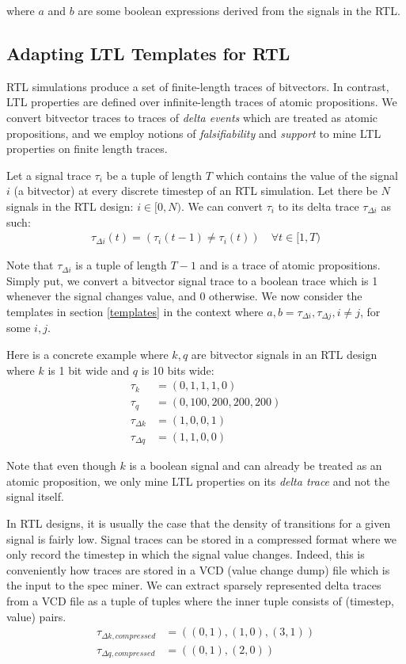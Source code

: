 \documentclass[acmlarge,11pt]{acmart}
\begin{document}
where $a$ and $b$ are some boolean expressions derived from the signals in the RTL.

\subsection{Adapting LTL Templates for RTL}
RTL simulations produce a set of finite-length traces of bitvectors.
In contrast, LTL properties are defined over infinite-length traces of atomic propositions.
We convert bitvector traces to traces of \textit{delta events} which are treated as atomic propositions, and we employ notions of \textit{falsifiability} and \textit{support} to mine LTL properties on finite length traces.

Let a signal trace $\tau_i$ be a tuple of length $T$ which contains the value of the signal $i$ (a bitvector) at every discrete timestep of an RTL simulation.
Let there be $N$ signals in the RTL design: $i \in [0,N)$.
We can convert $\tau_i$ to its delta trace $\tau_{\Delta i}$ as such:
\begin{align*}
  \tau_{\Delta i}(t) = (\tau_i(t-1) \neq \tau_i(t)) \quad \forall t \in [1,T)
\end{align*}

Note that $\tau_{\Delta i}$ is a tuple of length $T-1$ and is a trace of atomic propositions.
Simply put, we convert a bitvector signal trace to a boolean trace which is 1 whenever the signal changes value, and 0 otherwise.
We now consider the templates in section \ref{templates} in the context where $a, b = \tau_{\Delta i}, \tau_{\Delta j}, i \neq j$, for some $i, j$.

Here is a concrete example where $k, q$ are bitvector signals in an RTL design where $k$ is 1 bit wide and $q$ is 10 bits wide:
\begin{align*}
  \tau_{k} &= (0, 1, 1, 1, 0) \\
  \tau_{q} &= (0, 100, 200, 200, 200) \\
  \tau_{\Delta k} &= (1, 0, 0, 1) \\
  \tau_{\Delta q} &= (1, 1, 0, 0)
\end{align*}

Note that even though $k$ is a boolean signal and can already be treated as an atomic proposition, we only mine LTL properties on its \textit{delta trace} and not the signal itself.

In RTL designs, it is usually the case that the density of transitions for a given signal is fairly low.
Signal traces can be stored in a compressed format where we only record the timestep in which the signal value changes.
Indeed, this is conveniently how traces are stored in a VCD (value change dump) file which is the input to the spec miner.
We can extract sparsely represented delta traces from a VCD file as a tuple of tuples where the inner tuple consists of (timestep, value) pairs.
\begin{align*}
  \tau_{\Delta k, compressed} &= ((0,1), (1,0), (3,1)) \\
  \tau_{\Delta q, compressed} &= ((0,1), (2,0))
\end{align*}
\end{document}
